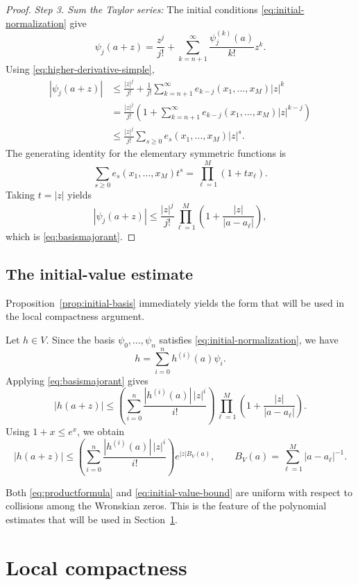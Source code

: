 \documentclass[12pt,letterpaper,reqno]{amsart}
\theoremstyle{definition}
\numberwithin{equation}{section}
\begin{document}
\begin{proof}
\medskip\noindent
\emph{{Step 3. Sum the Taylor series:}}
The initial conditions \eqref{eq:initial-normalization} give
\[
\psi_j(a+z)
=
\frac{z^j}{j!}
+
\sum_{k={n+1}}^{\infty}
\frac{\psi_j^{(k)}(a)}{k!}z^k.
\]
Using \eqref{eq:higher-derivative-simple},
\[
\begin{aligned}
|\psi_j(a+z)|
&\leq
\frac{|z|^j}{j!}
+
\frac1{j!}
\sum_{k={n+1}}^{\infty}
e_{k-j}(x_1,\ldots,x_M)|z|^k\\
&=
\frac{|z|^j}{j!}
\left(
1+
\sum_{k={n+1}}^{\infty}
e_{k-j}(x_1,\ldots,x_M)|z|^{k-j}
\right)\\
&\leq
\frac{|z|^j}{j!}
\sum_{s\geq0}
e_s(x_1,\ldots,x_M)|z|^s.
\end{aligned}
\]
The generating identity for the elementary symmetric functions is
\[
\sum_{s\geq0}
e_s(x_1,\ldots,x_M)t^s
=
\prod_{\ell=1}^M(1+t x_\ell).
\]
Taking \(t=|z|\) yields
\[
|\psi_j(a+z)|
\leq
\frac{|z|^j}{j!}
\prod_{\ell=1}^M
\left(
1+\frac{|z|}{|a-a_\ell|}
\right),
\]
which is \eqref{eq:basismajorant}.
\end{proof}


\subsection{The initial-value estimate}
\label{sec:initial-value-bound}

Proposition~\ref{prop:initial-basis} immediately yields the form that
will be used in the local compactness argument.

Let \(h\in V\). Since the basis
\(\psi_0,\ldots,\psi_{n}\) satisfies
\eqref{eq:initial-normalization}, we have
\[
h
=
\sum_{i=0}^{n}
h^{(i)}(a)\psi_i.
\]
Applying \eqref{eq:basismajorant} gives
\[
|h(a+z)|
\leq
\left(
\sum_{i=0}^{n}
\frac{|h^{(i)}(a)|\,|z|^i}{i!}
\right)
\prod_{\ell=1}^M
\left(
1+\frac{|z|}{|a-a_\ell|}
\right).
\]
Using \(1+x\leq e^x\), we obtain
\begin{equation}\label{eq:initial-value-bound}
 |h(a+z)|
 \leq
 \left(
 \sum_{i=0}^{n}
 \frac{|h^{(i)}(a)|\,|z|^i}{i!}
 \right)
 e^{|z|B_V(a)},
 \qquad
 B_V(a)
 =
 \sum_{\ell=1}^M|a-a_\ell|^{-1}.
\end{equation}

Both \eqref{eq:productformula} and
\eqref{eq:initial-value-bound} are uniform with respect to collisions
among the Wronskian zeros. This is the feature of the polynomial
estimates that will be used in Section~\ref{sec:compactness}.

\section{Local compactness}\label{sec:compactness}
\end{document}
